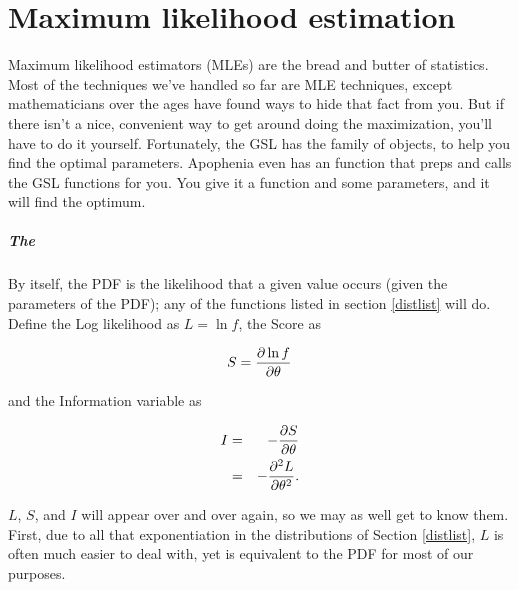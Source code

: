 \chapter{Maximum likelihood estimation} \label{mle}

Maximum likelihood estimators (MLEs) are the bread and butter of
statistics. Most of the techniques we've handled so far are MLE
techniques, except mathematicians over the ages have found ways to hide
that fact from you. But if there isn't a nice, convenient way to get
around doing the maximization, you'll have to do it yourself. Fortunately,
the GSL has the  family of objects, to help you find
the optimal parameters. Apophenia even has an 
function that preps and calls the GSL functions for you. You give it a
function and some parameters, and it will find the optimum.


\paragraph{The }	\label{the score}
By itself, the PDF is the likelihood that a given value occurs (given
the parameters of the PDF); any of the functions listed in section
\ref{distlist} will do. Define the Log likelihood as $L=\ln f$, the
Score as

$$S={\partial \ln f\over \partial \theta}$$ 

and the Information variable as

\begin{eqnarray}
I&=&-{\partial S \over \partial \theta}			\nonumber\\
&=&-{\partial^2 L \over \partial \theta^2}.		\nonumber
\end{eqnarray}

$L$, $S$, and $I$ will appear over and over again, so we may as well get
to know them. First, due to all that exponentiation in the distributions
of Section \ref{distlist}, $L$ is often much easier to deal with, yet
is equivalent to the PDF for most of our purposes. 

